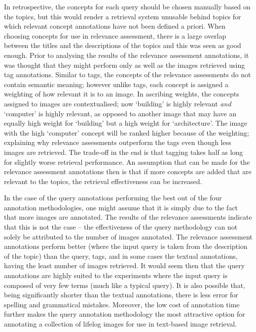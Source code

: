 In retrospective, the concepts for each query should be chosen manually based on the topics, but this would render a retrieval system unusable behind topics for which relevant concept annotations have not been defined a priori. When choosing concepts for use in relevance assessment, there is a large overlap between the titles and the descriptions of the topics and this was seen as good enough. Prior to analysing the results of the relevance assessment annotations, it was thought that they might perform only as well as the images retrieved using tag annotations. Similar to tags, the concepts of the relevance assessments do not contain semantic meaning; however unlike tags, each concept is assigned a weighting of how relevant it is to an image. In ascribing weights, the concepts assigned to images are contextualised; now `building' is highly relevant \textit{and} `computer' is highly relevant, as opposed to another image that may have an equally high weight for `building' but a high weight for `architecture'. The image with the high `computer' concept will be ranked higher because of the weighting; explaining why relevance assessments outperform the tags even though less images are retrieved. The trade-off in the end is that tagging takes half as long for slightly worse retrieval performance. An assumption that can be made for the relevance assessment annotations then is that if more concepts are added that are relevant to the topics, the retrieval effectiveness can be increased.

In the case of the query annotations performing the best out of the four annotation methodologies, one might assume that it is simply due to the fact that more images are annotated. The results of the relevance assessments indicate that this is not the case -- the effectiveness of the query methodology can not solely be attributed to the number of images annotated. The relevance assessment annotations perform better (where the input query is taken from the description of the topic) than the query, tags, and in some cases the textual annotations, having the least number of images retrieved. It would seem then that the query annotations are highly suited to the experiments where the input query is composed of very few terms (much like a typical query). It is also possible that, being significantly shorter than the textual annotations, there is less error for spelling and grammatical mistakes. Moreover, the low cost of annotation time further makes the query annotation methodology the most attractive option for annotating a collection of lifelog images for use in text-based image retrieval.

